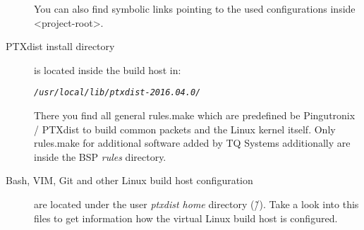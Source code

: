 \begin{description}
        You can also find symbolic links pointing to the used configurations
        inside <project-root>.

    \item[PTXdist install directory] is located inside the build host in:
        \begin{alltt}
        \newline \textit{/usr/local/lib/ptxdist-2016.04.0/}
        \end{alltt}
        There you find all general rules.make which are predefined be
        Pingutronix / PTXdist to build common packets and the Linux kernel
        itself. Only rules.make for additional software added by TQ Systems
        additionally are inside the BSP \textit{rules} directory.

    \item[Bash, VIM, Git and other Linux build host configuration] are located
        under the user \textit{ptxdist home} directory (\~/). Take a look into
        this files to get information how the virtual Linux build host is
        configured.
\end{description}

